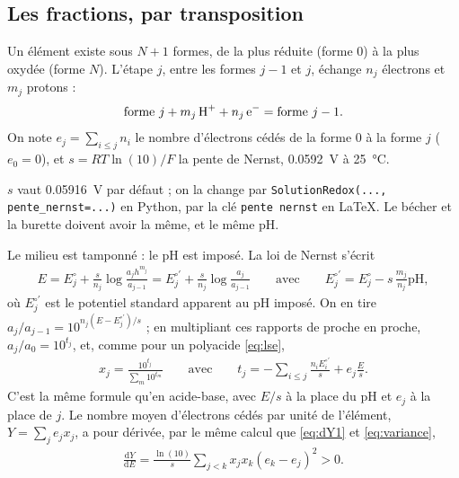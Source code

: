 \documentclass[a4paper,11pt]{article}
\newcommand\pH{\ensuremath{\mathrm{pH}}\xspace}
\newcommand\ddp[2]{\frac{\mathrm{d}#1}{\mathrm{d}#2}}
\newcommand\pare[1]{\left(#1\right)}
\newcommand\code[1]{\texttt{#1}}
\begin{document}
\subsection{Les fractions, par transposition}
Un élément existe sous $N+1$ formes, de la plus réduite (forme 0) à la plus oxydée (forme $N$).
L'étape $j$, entre les formes $j-1$ et $j$, échange $n_j$ électrons et $m_j$ protons :
\begin{align}
\text{forme }j+m_j\,\ce{H+}+n_j\,\ce{e-}=\text{forme }j-1.
\end{align}
On note $e_j=\sum_{i\le j}n_i$ le nombre d'électrons cédés de la forme 0 à la forme $j$ ($e_0=0$), et $s=RT\ln(10)/F$ la pente de Nernst, \qty{0,0592}{V} à \qty{25}{\degreeCelsius}.
\begin{option}
$s$ vaut \qty{0,05916}{V} par défaut ; on la change par \code{SolutionRedox(..., pente\_nernst=...)} en Python, par la clé \code{pente nernst} en \LaTeX.
Le bécher et la burette doivent avoir la même, et le même \pH.
\end{option}
Le milieu est tamponné : le \pH est imposé.
La loi de Nernst s'écrit
\begin{align}
E=E^\circ_j+\frac s{n_j}\log\frac{a_jh^{m_j}}{a_{j-1}}=E^{\circ\prime}_j+\frac s{n_j}\log\frac{a_j}{a_{j-1}}
\qquad\text{avec}\qquad
E^{\circ\prime}_j=E^\circ_j-s\,\frac{m_j}{n_j}\pH,
\end{align}
où $E^{\circ\prime}_j$ est le potentiel standard apparent au \pH imposé.
On en tire $a_j/a_{j-1}=10^{n_j(E-E^{\circ\prime}_j)/s}$ ; en multipliant ces rapports de proche en proche, $a_j/a_0=10^{t_j}$, et, comme pour un polyacide \eqref{eq:lse},
\begin{align}
x_j=\frac{10^{t_j}}{\sum_m10^{t_m}}
\qquad\text{avec}\qquad
t_j=-\sum_{i\le j}\frac{n_iE^{\circ\prime}_i}s+e_j\frac Es.
\end{align}
C'est la même formule qu'en acide-base, avec $E/s$ à la place du \pH et $e_j$ à la place de $j$.
Le nombre moyen d'électrons cédés par unité de l'élément, $Y=\sum_je_jx_j$, a pour dérivée, par le même calcul que \eqref{eq:dY1} et \eqref{eq:variance},
\begin{align}
\ddp YE=\frac{\ln(10)}s\sum_{j<k}x_jx_k\pare{e_k-e_j}^2>0.
\end{align}
\end{document}
